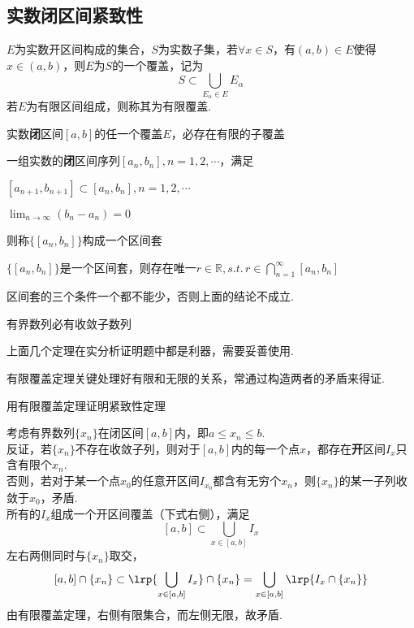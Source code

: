 \subsection{实数闭区间紧致性}
\begin{definition}[覆盖]
$E$为实数开区间构成的集合，$S$为实数子集，若$\forall x\in S$，有$(a,b)\in E$使得$x\in(a,b)$，则$E$为$S$的一个覆盖，记为
\[S\subset\bigcup_{E_\alpha\in E}E_\alpha\]
若$E$为有限区间组成，则称其为有限覆盖.
\end{definition}
\begin{theorem}
实数\textbf{闭}区间$[a,b]$的任一个覆盖$E$，必存在有限的子覆盖
\end{theorem}
\begin{definition}[区间套]
一组实数的\textbf{闭}区间序列$[a_n,b_n],n=1,2,\cdots$，满足
\begin{partlist}
	\item $[a_{n+1},b_{n+1}]\subset[a_n,b_n],n=1,2,\cdots$
	\item $\displaystyle\lim_{n\to\infty}(b_n-a_n)=0$
\end{partlist}
则称$\{[a_n,b_n]\}$构成一个区间套
\end{definition}
\begin{theorem}[区间套定理]
$\{[a_n,b_n]\}$是一个区间套，则存在唯一$\displaystyle r\in\mathbb{R},s.t.\,r\in\bigcap_{n=1}^{\infty}[a_n,b_n]$
\end{theorem}
\par 区间套的三个条件一个都不能少，否则上面的结论不成立.
\begin{theorem}
有界数列必有收敛子数列
\end{theorem}
\par 上面几个定理在实分析证明题中都是利器，需要妥善使用.
\par 有限覆盖定理关键处理好有限和无限的关系，常通过构造两者的矛盾来得证.
\begin{example}
用有限覆盖定理证明紧致性定理
\end{example}
\begin{analysis}
考虑有界数列$\{x_n\}$在闭区间$[a,b]$内，即$a\leq x_n\leq b$.\\
反证，若$\{x_n\}$不存在收敛子列，则对于$[a,b]$内的每一个点$x$，都存在\textbf{开}区间$I_x$只含有限个$x_n$.\\
否则，若对于某一个点$x_0$的任意开区间$I_{x_0}$都含有无穷个$x_n$，则$\{x_n\}$的某一子列收敛于$x_0$，矛盾.\\
所有的$I_x$组成一个开区间覆盖（下式右侧），满足
\[[a,b]\subset\bigcup_{x\in[a,b]}I_x\]
左右两侧同时与$\{x_n\}$取交，
\[[a,b]\cap\{x_n\}\subset\lrp{\bigcup_{x\in[a,b]}I_x}\cap\{x_n\}=\bigcup_{x\in[a,b]}\lrp{I_x\cap\{x_n\}}\]
由有限覆盖定理，右侧有限集合，而左侧无限，故矛盾.
\end{analysis}
